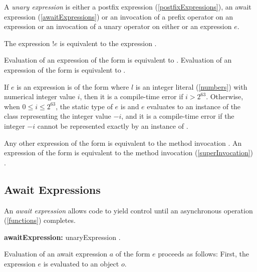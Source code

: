 \documentclass{article}
\begin{document}
\LMHash{}
A {\em unary expression} is either a postfix expression (\ref{postfixExpressions}), an await expression (\ref{awaitExpressions}) or an invocation of a prefix operator on an expression or an invocation of a unary operator on either \SUPER{} or an expression $e$.

\LMHash{}
The expression $!e$ is equivalent to the expression .

\LMHash{}
Evaluation of an expression of the form  is equivalent to .
Evaluation of an expression of the form  is equivalent to .


\LMHash{}
If $e$ is an expression is of the form 
where $l$ is an integer literal (\ref{numbers}) with numerical integer value $i$,
then it is a compile-time error if $i \gt{} 2^{63}$.
Otherwise, when $0 \le{} i \le{} 2^{63}$, the static type of $e$ is 
and $e$ evaluates to an instance of the class 
representing the integer value $-i$,
and it is a compile-time error if the integer $-i$ cannot be represented exactly
by an instance of .

\LMHash{}
Any other expression of the form  is equivalent to the method invocation .
An expression of the form  is equivalent to the method invocation (\ref{superInvocation}) .


\subsection{Await Expressions}

\LMHash{}
An {\em await expression} allows code to yield control until an asynchronous operation (\ref{functions}) completes.

\begin{grammar}
{\bf awaitExpression:}\AWAIT{} unaryExpression
  .
\end{grammar}

\LMHash{}
Evaluation of an await expression $a$ of the form \AWAIT{} $e$ proceeds as follows:
First, the expression $e$ is evaluated to an object $o$.
\end{document}
